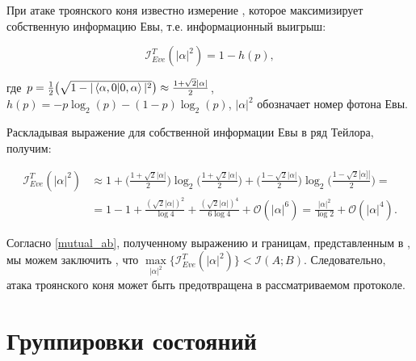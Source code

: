 \documentclass[a4paper,11pt]{article}
\begin{document}
\begin{figure}[h]
	\label{ris:image2}
\end{figure}


При атаке троянского коня известно измерение \cite{trojan, trojan3}, которое максимизирует собственную информацию Евы, т.е. информационный выигрыш:

\begin{equation*}
\mathcal{I}_{Eve}^{T}(|\alpha|^2) = 1 - h(p),
\end{equation*}

где $p = \frac{1}{2} \big(\sqrt{1 - |\braket{\alpha, 0 | 0, \alpha}|^2 } \big) \approx \frac{1 + \sqrt2 |\alpha|}{2}$, $h(p) = -p\log_2(p) - (1-p)\log_2(p)$, $|\alpha|^2$ обозначает номер фотона Евы.

Раскладывая выражение для собственной информации Евы в ряд Тейлора, получим:

\begin{align*}
\mathcal{I}_{Eve}^{T}(|\alpha|^2) &\approx 1 + 
\Big( \frac{1 + \sqrt2 |\alpha|}{2} \Big) \log_2 \Big(\frac{1 + \sqrt2 |\alpha|}{2}\Big) + \Big( \frac{1 - \sqrt2 |\alpha|}{2} \Big) \log_2 \Big(\frac{1 - \sqrt2 |\alpha]|}{2}\Big) = \nonumber \\
&= 1 - 1 + \frac{(\sqrt2 |\alpha|)^2}{\log4} + \frac{(\sqrt2 |\alpha|)^4}{6\log4} + \mathcal{O}(|\alpha|^6) = \frac{|\alpha|^2}{\log2} + \mathcal{O}(|\alpha|^4).
\end{align*}

Согласно \eqref{mutual_ab}, полученному выражению и границам, представленным в \cite{trojan}, мы можем заключить \cite{base}, что $\max\limits_{|\alpha|^2} \big\{\mathcal{I}_{Eve}^{T} (|\alpha|^2) \big\} < \mathcal{I}(A; B)$. Следовательно, атака троянского коня может быть предотвращена в рассматриваемом протоколе.

   
\appendix
\section{Группировки состояний}\label{app}
\end{document}
